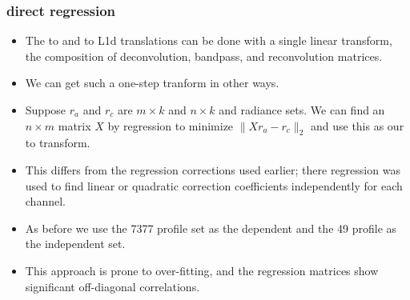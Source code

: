 \documentclass[10pt]{beamer}
\begin{document}
\begin{frame}
\frametitle{direct regression}
\begin{itemize}

  \item The {\airs} to {\cris} and {\airs} to L1d translations 
    can be done with a single linear transform, the composition 
    of deconvolution, bandpass, and reconvolution matrices.

  \item We can get such a one-step tranform in other ways.

  \item Suppose $r_a$ and $r_c$ are $m \times k$ and $n \times k$
    {\airs} and {\cris} radiance sets.  We can find an $n \times m$
    matrix $X$ by regression to minimize $\|X r_a - r_c\|_2$ and use
    this as our {\airs} to {\cris} transform.

  \item This differs from the regression corrections used earlier;
    there regression was used to find linear or quadratic correction
    coefficients independently for each channel.

  \item As before we use the 7377 profile set as the dependent and
    the 49 profile as the independent set.

  \item This approach is prone to over-fitting, and the regression
    matrices show significant off-diagonal correlations.

\end{itemize}
\end{frame}
\end{document}
